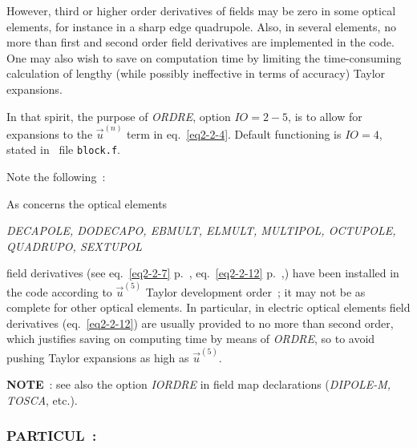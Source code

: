 \smallskip

\noindent However, third or  higher order derivatives of fields  may be zero in some 
optical elements, for instance in a sharp edge quadrupole. Also, in 
several elements, no more than  first and second order field 
derivatives  are implemented in the code.  One may also wish to save on computation time by 
limiting the time-consuming calculation of lengthy (while possibly ineffective in terms 
of accuracy) Taylor expansions. 

\bigskip

\noindent In that spirit, the purpose of \textsl{ORDRE}, option $ IO=2-5$,  is to allow for 
expansions  to the  $ \vec  u^{(n)}$ term  in eq.~\ref{eq2-2-4}. Default functioning 
is $IO=4$, stated in \FORTRAN\ file \texttt{block.f}.

\bigskip

\noindent Note the following~: 

\noindent As concerns the optical elements
\begin{center}
	\textsl{
   DECAPOLE, DODECAPO,  EBMULT, ELMULT, 
	MULTIPOL, OCTUPOLE,   \\
              QUADRUPO, SEXTUPOL}
\end{center}
field derivatives (see eq.~\ref{eq2-2-7} p.~\pageref{eq2-2-7}, eq.~\ref{eq2-2-12} p.~\pageref{eq2-2-12},) 
have been installed in the code according 
to $ \vec  u^{(5)}$ Taylor development order~; it may not 
be as complete for  other optical elements. In particular, 
in electric optical elements field  derivatives (eq.~\ref{eq2-2-12}) are usually provided to no more than second 
order, which justifies saving on computing time by means of \textsl{ORDRE}, 
so to avoid pushing Taylor expansions as high as  $ \vec  u^{(5)}$. 


\bigskip

\noindent\textbf{NOTE}~: see also the option \textsl{IORDRE} in field map
declarations (\textsl{DIPOLE-M, TOSCA}, etc.).  



 \newpage

\subsubsection*{PARTICUL~: \PARTICULTitl}  \label{PARTICUL} 
\medskip 

